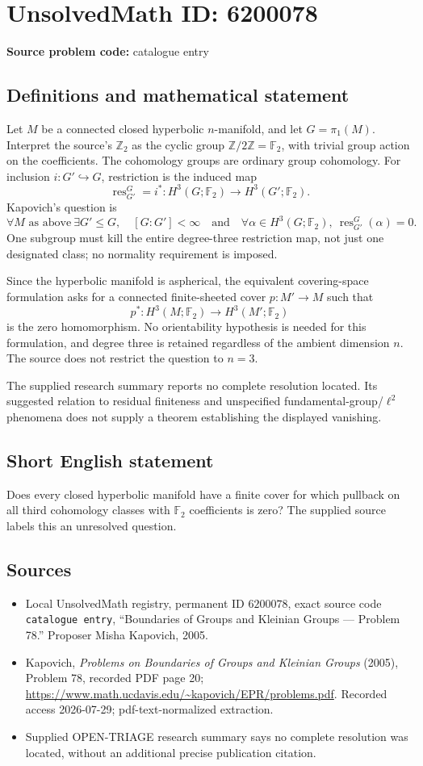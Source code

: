 \documentclass[11pt]{article}
\newcommand{\Z}{\mathbb{Z}}
\newcommand{\F}{\mathbb{F}}
\begin{document}
\section*{UnsolvedMath ID: 6200078}
\textbf{Source problem code:} catalogue entry
\subsection{Definitions and mathematical statement}
Let \(M\) be a connected closed hyperbolic \(n\)-manifold, and let \(G=\pi_1(M)\). Interpret the source's \(\Z_2\) as the cyclic group \(\Z/2\Z=\F_2\), with trivial group action on the coefficients. The cohomology groups are ordinary group cohomology. For inclusion \(i:G'\hookrightarrow G\), restriction is the induced map
\[
\operatorname{res}^{G}_{G'}=i^*:H^3(G;\F_2)\longrightarrow H^3(G';\F_2).
\]
Kapovich's question is
\[
\forall M\text{ as above}\ \exists G'\le G,\quad
[G:G']<\infty\quad\text{and}\quad
\forall\alpha\in H^3(G;\F_2),\ 
\operatorname{res}^{G}_{G'}(\alpha)=0.
\]
One subgroup must kill the entire degree-three restriction map, not just one designated class; no normality requirement is imposed.

Since the hyperbolic manifold is aspherical, the equivalent covering-space formulation asks for a connected finite-sheeted cover \(p:M'\to M\) such that
\[
p^*:H^3(M;\F_2)\longrightarrow H^3(M';\F_2)
\]
is the zero homomorphism. No orientability hypothesis is needed for this formulation, and degree three is retained regardless of the ambient dimension \(n\). The source does not restrict the question to \(n=3\).

The supplied research summary reports no complete resolution located. Its suggested relation to residual finiteness and unspecified fundamental-group/\(\ell^2\) phenomena does not supply a theorem establishing the displayed vanishing.
\subsection{Short English statement}
Does every closed hyperbolic manifold have a finite cover for which pullback on all third cohomology classes with \(\F_2\) coefficients is zero? The supplied source labels this an unresolved question.
\subsection{Sources}
\begin{itemize}
\item Local UnsolvedMath registry, permanent ID \(6200078\), exact source code \texttt{catalogue entry}, ``Boundaries of Groups and Kleinian Groups --- Problem 78.'' Proposer Misha Kapovich, 2005.
\item Kapovich, \emph{Problems on Boundaries of Groups and Kleinian Groups} (2005), Problem 78, recorded PDF page 20; \url{https://www.math.ucdavis.edu/~kapovich/EPR/problems.pdf}. Recorded access 2026-07-29; pdf-text-normalized extraction.
\item Supplied OPEN-TRIAGE research summary says no complete resolution was located, without an additional precise publication citation.
\end{itemize}
\end{document}
